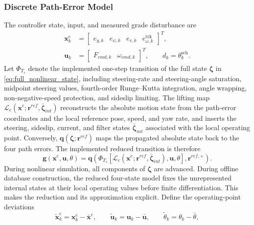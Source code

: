 \documentclass{ieeeaccess}
\begin{document}
\subsubsection{Discrete Path-Error Model}

The controller state, input, and measured grade disturbance are
\begin{equation}
\begin{aligned}
\bm{x}^{e}_k
&=\begin{bmatrix}e_{y,k}&e_{\psi,k}&e_{v,k}&e_{\omega,k}^{\mathrm{trk}}\end{bmatrix}^{T},\\
\bm{u}_k
&=\begin{bmatrix}F_{cmd,k}&\omega_{cmd,k}\end{bmatrix}^{T},
\qquad d_k=\theta^{\mathrm{sch}}_k .
\end{aligned}
\label{eq:discrete_error_state}
\end{equation}
Let $\Phi_{T_s}$ denote the implemented one-step transition of the full state $\bm\zeta$ in \eqref{eq:full_nonlinear_state}, including steering-rate and steering-angle saturation, midpoint steering values, fourth-order Runge--Kutta integration, angle wrapping, non-negative-speed protection, and sideslip limiting. The lifting map $\mathcal L_e(\bm x^e;\bm r^{ref},\bar{\bm\zeta}_{int})$ reconstructs the absolute motion state from the path-error coordinates and the local reference pose, speed, and yaw rate, and inserts the steering, sideslip, current, and filter states $\bar{\bm\zeta}_{int}$ associated with the local operating point. Conversely, $\bm q(\bm\zeta;\bm r^{ref})$ maps the propagated absolute state back to the four path errors. The implemented reduced transition is therefore
\begin{equation}
\bm g(\bm x^e,\bm u,\theta)
=\bm q\!\left(
\Phi_{T_s}\!\left[
\mathcal L_e(\bm x^e;\bm r^{ref},\bar{\bm\zeta}_{int}),
\bm u,\theta\right],\bm r^{ref,+}
\right).
\label{eq:implemented_error_transition}
\end{equation}
During nonlinear simulation, all components of $\bm\zeta$ are advanced. During offline database construction, the reduced four-state model fixes the unrepresented internal states at their local operating values before finite differentiation. This makes the reduction and its approximation explicit. Define the operating-point deviations
\begin{equation}
\widetilde{\bm x}^{e}_k=\bm x^e_k-\bar{\bm x}^{e},\qquad
\widetilde{\bm u}_k=\bm u_k-\bar{\bm u},\qquad
\widetilde\theta_k=\theta_k-\bar\theta,
\label{eq:operating_point_deviations}
\end{equation}
\end{document}
